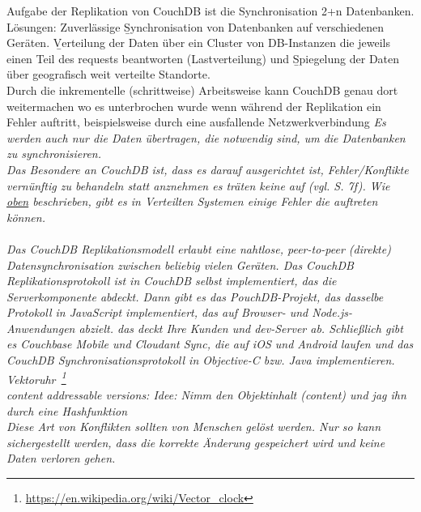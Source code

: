 
Aufgabe der Replikation von CouchDB ist die Synchronisation 2+n Datenbanken. Lösungen: Zuverlässige \b{Synchronisation} von Datenbanken auf verschiedenen Geräten. \b{Verteilung} der Daten über ein Cluster von DB-Instanzen die jeweils einen Teil des requests beantworten (Lastverteilung) und \b{Spiegelung} der Daten über geografisch weit verteilte Standorte.\\
Durch die inkrementelle (schrittweise) Arbeitsweise kann CouchDB genau dort weitermachen wo es unterbrochen wurde wenn während der Replikation ein Fehler auftritt, beispielsweise durch eine ausfallende Netzwerkverbindung
\it{Es werden auch nur die Daten übertragen, die notwendig sind, um die Datenbanken zu synchronisieren.}\\
Das Besondere an CouchDB ist, dass es darauf ausgerichtet ist, Fehler/Konflikte vernünftig zu behandeln statt anznehmen es träten keine auf (vgl. \cite{couchDB} S. 7f). Wie \hyperref[sec:conflict]{oben} beschrieben, gibt es in Verteilten Systemen einige Fehler die auftreten können.\\\\
\it{Das CouchDB Replikationsmodell erlaubt eine nahtlose, peer-to-peer (direkte) Datensynchronisation zwischen beliebig vielen Geräten. Das CouchDB Replikationsprotokoll ist in CouchDB selbst implementiert, das die Serverkomponente abdeckt. Dann gibt es das PouchDB-Projekt, das dasselbe Protokoll in JavaScript implementiert, das auf Browser- und Node.js-Anwendungen abzielt. das deckt Ihre Kunden und dev-Server ab. Schließlich gibt es Couchbase Mobile und Cloudant Sync, die auf iOS und Android laufen und das CouchDB Synchronisationsprotokoll in Objective-C bzw. Java implementieren.}\\
Vektoruhr~\footnote{\url{https://en.wikipedia.org/wiki/Vector_clock}} \\
content addressable versions: Idee: Nimm den Objektinhalt (content) und jag ihn durch eine \gls{Hashfunktion}\\
%
Diese Art von Konflikten sollten von Menschen gelöst werden. Nur so kann sichergestellt werden, dass die korrekte Änderung gespeichert wird und keine Daten verloren gehen.
%


